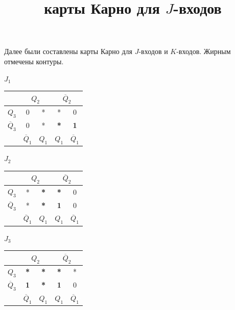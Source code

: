 \documentclass[14pt, a4paper]{extarticle}
\begin{document}
\noindent Далее были составлены карты Карно для $J$-входов и $K$-входов. Жирным отмечены контуры.
\begin{center}
	\small	
	\begin{minipage}{0.32\textwidth}
		\centering
		\textbf{$J_1$}\\[4pt]
		\begin{tabular}{|c|c|c|c|c|}
			\hline
			& \multicolumn{2}{c|}{$Q_2$} & \multicolumn{2}{c|}{$\overline{Q}_2$} \\ \hline
			$Q_3$ & 0 & * & * & 0 \\ \hline
			$\overline{Q}_3$ & 0 & * & \textbf{*} & \textbf{1} \\ \hline
			& $\overline{Q}_1$ & $Q_1$ & $Q_1$ & $\overline{Q}_1$ \\ \hline
		\end{tabular}
	\end{minipage}
	\hfill
	\begin{minipage}{0.32\textwidth}
		\centering
		\textbf{$J_2$}\\[4pt]
		\begin{tabular}{|c|c|c|c|c|}
			\hline
			& \multicolumn{2}{c|}{$Q_2$} & \multicolumn{2}{c|}{$\overline{Q}_2$} \\ \hline
			$Q_3$ & * & \textbf{*} & \textbf{*} & 0 \\ \hline
			$\overline{Q}_3$ & * & \textbf{*} & \textbf{1} & 0 \\ \hline
			& $\overline{Q}_1$ & $Q_1$ & $Q_1$ & $\overline{Q}_1$ \\ \hline
		\end{tabular}
	\end{minipage}
	\hfill
	\begin{minipage}{0.32\textwidth}
		\centering
		\textbf{$J_3$}\\[4pt]
		\begin{tabular}{|c|c|c|c|c|}
			\hline
			& \multicolumn{2}{c|}{$Q_2$} & \multicolumn{2}{c|}{$\overline{Q}_2$} \\ \hline
			$Q_3$ & \textbf{*} & \textbf{*} & \textbf{*} & * \\ \hline
			$\overline{Q}_3$ & \textbf{1} & \textbf{*} & \textbf{1} & 0 \\ \hline
			& $\overline{Q}_1$ & $Q_1$ & $Q_1$ & $\overline{Q}_1$ \\ \hline
		\end{tabular}
	\end{minipage}
	\title{карты Карно для $J$-входов}
\end{center}
\end{document}
